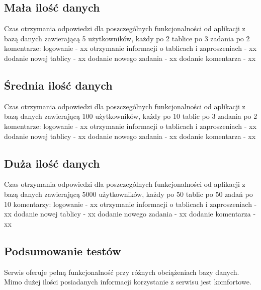 \documentclass[12pt]{report}
\begin{document}
\subsection{Mała ilość danych}
Czas otrzymania odpowiedzi dla poszczególnych funkcjonalności od aplikacji z bazą danych zawierającą 5 użytkowników, każdy po 2 tablice po 3 zadania po 2 komentarze:\newline
logowanie - xx \newline
otrzymanie informacji o tablicach i zaproszeniach - xx \newline
dodanie nowej tablicy - xx \newline
dodanie nowego zadania - xx \newline
dodanie komentarza - xx

\subsection{Średnia ilość danych}
Czas otrzymania odpowiedzi dla poszczególnych funkcjonalności od aplikacji z bazą danych zawierającą 100 użytkowników, każdy po 10 tablic po 3 zadania po 2 komentarze:\newline
logowanie - xx \newline
otrzymanie informacji o tablicach i zaproszeniach - xx \newline
dodanie nowej tablicy - xx \newline
dodanie nowego zadania - xx \newline
dodanie komentarza - xx

\subsection{Duża ilość danych}
Czas otrzymania odpowiedzi dla poszczególnych funkcjonalności od aplikacji z bazą danych zawierającą 5000 użytkowników, każdy po 50 tablic po 50 zadań po 10 komentarzy: \newline
logowanie - xx\newline
otrzymanie informacji o tablicach i zaproszeniach - xx\newline
dodanie nowej tablicy - xx\newline
dodanie nowego zadania - xx\newline
dodanie komentarza - xx

\subsection{Podsumowanie testów}
Serwis oferuje pełną funkcjonalność przy różnych obciążeniach bazy danych. Mimo dużej ilości posiadanych informacji korzystanie z serwisu jest komfortowe.
\end{document}

